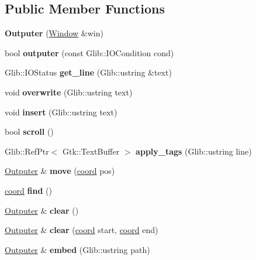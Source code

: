 \subsection*{Public Member Functions}
\begin{DoxyCompactItemize}
\item 
\mbox{\label{a00040_a1ed68f578cf79072628c058a77ac526f}} 
{\bfseries Outputer} (\hyperlink{a00036}{Window} \&win)
\item 
\mbox{\label{a00040_ab409d72eb7c8d60261e8b451eb3a9031}} 
bool {\bfseries outputer} (const Glib\+::\+I\+O\+Condition cond)
\item 
\mbox{\label{a00040_afcce9d49fc8a6e85e58bc9c10ba78837}} 
Glib\+::\+I\+O\+Status {\bfseries get\+\_\+line} (Glib\+::ustring \&text)
\item 
\mbox{\label{a00040_ab36a8f86bc8f2dd5d0cebb298c722240}} 
void {\bfseries overwrite} (Glib\+::ustring text)
\item 
\mbox{\label{a00040_aba4b142594b10391af77d8608a4612a4}} 
void {\bfseries insert} (Glib\+::ustring text)
\item 
\mbox{\label{a00040_a331e1caaa2758ba90ef37dd5cd692ace}} 
bool {\bfseries scroll} ()
\item 
\mbox{\label{a00040_a1fdb2e3ec891aa8a1bc323a948176c4f}} 
Glib\+::\+Ref\+Ptr$<$ Gtk\+::\+Text\+Buffer $>$ {\bfseries apply\+\_\+tags} (Glib\+::ustring line)
\item 
\mbox{\label{a00040_a35276191a6160fa01cc10814fa31336d}} 
\hyperlink{a00040}{Outputer} \& {\bfseries move} (\hyperlink{a00024}{coord} pos)
\item 
\mbox{\label{a00040_a7f603710dea2693773dd6c35e7741c37}} 
\hyperlink{a00024}{coord} {\bfseries find} ()
\item 
\mbox{\label{a00040_ad227daca0305ff2c9851a6be453233c9}} 
\hyperlink{a00040}{Outputer} \& {\bfseries clear} ()
\item 
\mbox{\label{a00040_a3a870833afca353df55a645c1368e34e}} 
\hyperlink{a00040}{Outputer} \& {\bfseries clear} (\hyperlink{a00024}{coord} start, \hyperlink{a00024}{coord} end)
\item 
\mbox{\label{a00040_a5bbb0d66e6ff4812e575ddfb560db585}} 
\hyperlink{a00040}{Outputer} \& {\bfseries embed} (Glib\+::ustring path)
\end{DoxyCompactItemize}
